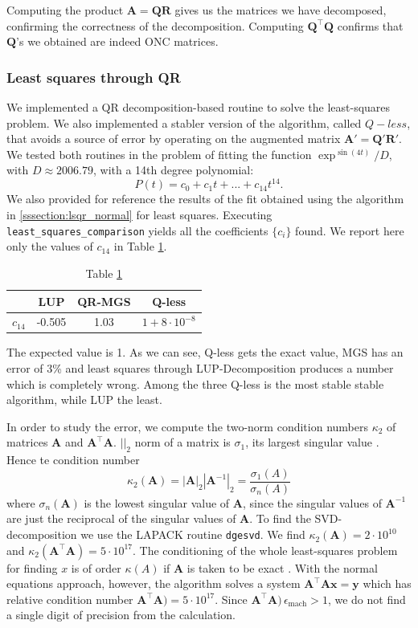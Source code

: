 \documentclass[a4paper,11]{article}
\newcommand{\mdcode}[1]{\lstinline[backgroundcolor=\color{gray!10}, frame=single, frameround=tttt]|#1|}
\newcommand{\emach}{\epsilon_{\text{mach}}}
\begin{document}
%
Computing the product $\mathbf{A=QR}$ gives us the matrices we have decomposed,
confirming the correctness of the decomposition.
Computing $\mathbf{Q}^\intercal \mathbf{Q}$ confirms that
$\mathbf{Q}$'s we obtained are indeed ONC matrices. 

\subsubsection{Least squares through QR}

We implemented a QR decomposition-based 
routine to solve the least-squares problem. We also implemented 
a stabler version of the algorithm, called 
$Q-less$, that avoids a source of error by operating on the augmented matrix 
$\mathbf A' = \mathbf Q' \mathbf R'$. We tested both routines
in the problem of fitting the function $\exp^{\sin(4t)}/D$,
with $D\approx 2006.79$, with a 14th degree
polynomial:
\[
	P(t)=c_{0}+c_{1}t+...+c_{14}t^{14}.
\]
We also provided for reference the results of the fit obtained using 
the algorithm in \ref{sssection:lsqr_normal} for least squares.
Executing \mdcode{least_squares_comparison} yields all the coefficients 
$\{c_{i}\}$ found. We report here only the values of $c_{14}$ in Table 
\ref{table:c14}.
%
\begin{table}[ht]
	\centering
	\begin{tabular}{c|c|c|c}
		 & LUP & QR-MGS & Q-less \\
		\hline
		$c_{14}$ & -0.505 & 1.03 & $1+8\cdot10^{-8}$ \\
	\end{tabular}
	\caption{Table \ref{table:c14}}
	\label{table:c14}
\end{table}
%
The expected value is 1. As we can see, Q-less gets the exact value, MGS has 
an error of 3\% and least squares through LUP-Decomposition produces a number 
which is completely wrong. Among the three Q-less is the most stable stable 
algorithm, while LUP the least.

In order to study the error, we compute the
two-norm condition numbers $\kappa_{2}$ of matrices $\mathbf A$ and 
$\mathbf A^{\intercal}\mathbf A$.
$||_{2}$ norm of a matrix is $\sigma_{1}$, its largest singular value
\parencite[1.11 Norme matriciali]{quarteroni}. Hence te condition number
\[
	\kappa_{2}(\mathbf A) = |\mathbf A|_{2}|\mathbf A^{-1}|_{2} =
		\frac{\sigma_{1}(A)}{\sigma_{n}(A)}
\]
where $\sigma_{n}(\mathbf A)$ is the lowest singular value of $\mathbf A$, 
since the singular 
values of $\mathbf A^{-1}$ are just the reciprocal of the singular values of 
$\mathbf A$.
To find the SVD-decomposition we use the LAPACK routine \mdcode{dgesvd}.
We find $\kappa_{2}(\mathbf A)=2\cdot 10^{10}$ and 
$\kappa_{2}(\mathbf A^{\intercal}\mathbf A)=5\cdot 10^{17}$.
The conditioning of the whole least-squares problem for finding $x$
is of order $\kappa(A)$ if $\mathbf A$ is taken to be exact
\parencite[18]{trefethen}. With the normal equations approach, however, 
the algorithm solves a system $\mathbf A^{\intercal}\mathbf A \mathbf x =
\mathbf y$ which has relative condition number 
$\mathbf A^{\intercal}\mathbf A)=5\cdot 10^{17}$. Since 
$\mathbf A^{\intercal}\mathbf A) \, \emach > 1$, we do not find a single digit 
of precision from the calculation. 
\end{document}
